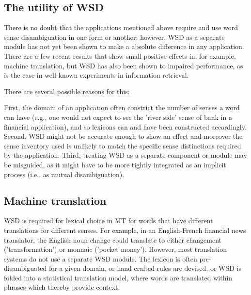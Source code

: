 \documentclass[11pt]{article}
\begin{document}
\nocite{Agirre04smoothingand,Fujii98corpus-basedword,Navigli:2009:WSD:1459352.1459355}
\printbibliography
\endrefsection



\subsection{The utility of WSD}

There is no doubt that the applications mentioned above require and use word sense disambiguation in one form or another; however, WSD as a separate module has not yet been shown to make a absolute difference in any application. There are a few recent results that show small positive effects in, for example, machine translation, but WSD has also been shown to impaired performance, as is the case in well-known experiments in information retrieval.

There are several possible reasons for this:

 First, the domain of an application often constrict the number of senses a word can have (e.g., one would not expect to see the 'river side' sense of bank in a financial application), and so lexicons can and have been constructed accordingly. 
 Second, WSD might not be accurate enough to show an effect and moreover the sense inventory used is unlikely to match the specific sense distinctions required by the application. 
 Third, treating WSD as a separate component or module may be misguided, as it might have to be more tightly integrated as an implicit process (i.e., as mutual disambiguation).

\nocite{Agirre04smoothingand,Fujii98corpus-basedword,Navigli:2009:WSD:1459352.1459355}
\printbibliography
\endrefsection


\subsection{Machine translation}

WSD is required for lexical choice in MT for words that have different translations for different senses. For example, in an English-French financial news translator, the English noun change could translate to either changement ('transformation') or monnaie ('pocket money'). However, most translation systems do not use a separate WSD module. The lexicon is often pre-disambiguated for a given domain, or hand-crafted rules are devised, or WSD is folded into a statistical translation model, where words are translated within phrases which thereby provide context.
\end{document}
